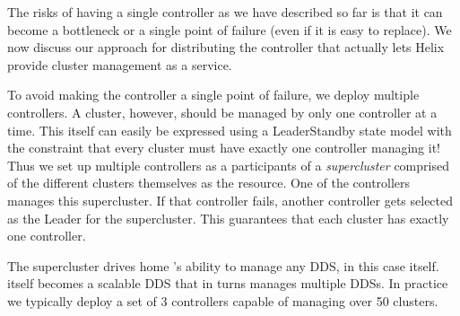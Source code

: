 The risks of having a single controller as we have described so far is that it
can become a bottleneck or a single point of failure (even if it is easy to
replace).  We now discuss our approach for distributing the controller that
actually lets Helix provide cluster management as a service. 

To avoid making the controller a single point of failure, we deploy multiple
controllers. A cluster, however, should be managed by only one controller at a time. 
This itself can easily be expressed using a LeaderStandby state model with the constraint 
that every cluster must have exactly one controller managing it! Thus we set up multiple 
controllers as a participants of a \emph{supercluster} comprised of the different clusters 
themselves as the resource. One of the controllers manages this supercluster. If that controller 
fails, another controller gets selected as the Leader for the supercluster. This
guarantees that each cluster has exactly one controller.  

The supercluster drives home \helix's ability to manage any DDS, in this case
itself.  \helix itself becomes a scalable DDS that in turns manages multiple DDSs. 
In practice we typically deploy a set of 3 controllers capable of managing over
50 clusters. 

